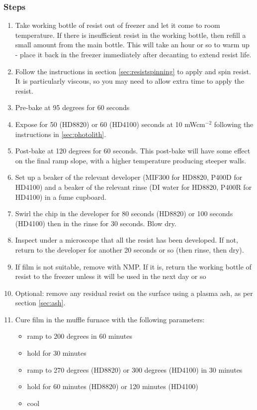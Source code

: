 \subsubsection{Steps}
\begin{enumerate}
\item Take working bottle of resist out of freezer and let it come to room temperature. If there is insufficient resist in the working bottle, then refill a small amount from the main bottle. This will take an hour or so to warm up - place it back in the freezer immediately after decanting to extend resist life.
\item Follow the instructions in section \ref{sec:resistspinning} to apply and spin resist. It is particularly viscous, so you may need to allow extra time to apply the resist.
\item Pre-bake at 95 degrees for 60 seconds
\item Expose for 50 (HD8820) or 60 (HD4100) seconds at 10 mWcm$^{-2}$ following the instructions in \ref{sec:photolith}.
\item Post-bake at 120 degrees for 60 seconds. This post-bake will have some effect on the final ramp slope, with a higher temperature producing steeper walls.
\item Set up a beaker of the relevant developer (MIF300 for HD8820, P400D for HD4100) and a beaker of the relevant rinse (DI water for HD8820, P400R for HD4100) in a fume cupboard.
\item Swirl the chip in the developer for 80 seconds (HD8820) or 100 seconds (HD4100) then in the rinse for 30 seconds. Blow dry.
\item Inspect under a microscope that all the resist has been developed. If not, return to the developer for another 20 seconds or so (then rinse, then dry).
\item If film is not suitable, remove with NMP. If it is, return the working bottle of resist to the freezer unless it will be used in the next day or so
\item Optional: remove any residual resist on the surface using a plasma ash, as per section \ref{sec:ash}.
\item Cure film in the muffle furnace with the following parameters:
\begin{itemize}
	\item ramp to 200 degrees in 60 minutes
	\item hold for 30 minutes
	\item ramp to 270 degrees (HD8820) or 300 degrees (HD4100) in 30 minutes
	\item hold for 60 minutes (HD8820) or 120 minutes (HD4100)
	\item cool
\end{itemize}
\end{enumerate}

